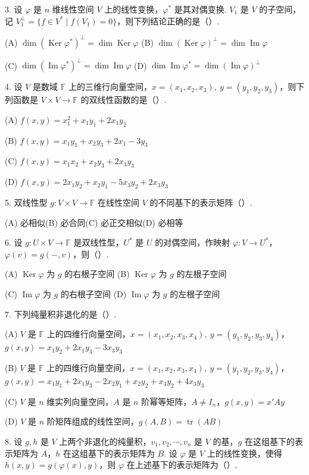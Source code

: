 \documentclass[UTF8,12pt,a4paper,fontset=fandol]{ctexart}
\begin{document}
3. 设 $\varphi$ 是 $n$ 维线性空间 $V$ 上的线性变换，$\varphi^*$ 是其对偶变换. $V_1$ 是 $V$ 的子空间，记 $V_1^\perp=\{f\in V^*\mid f(V_1)=0\}$，则下列结论正确的是（\quad ）.

(A) $\dim(\operatorname{Ker}\varphi^*)^\perp=\dim\operatorname{Ker}\varphi$
\quad
(B) $\dim(\operatorname{Ker}\varphi)^\perp=\dim\operatorname{Im}\varphi$

(C) $\dim(\operatorname{Im}\varphi^*)^\perp=\dim\operatorname{Im}\varphi$
\quad
(D) $\dim\operatorname{Im}\varphi^*=\dim(\operatorname{Im}\varphi)^\perp$

4. 设 $V$ 是数域 $\mathbb{F}$ 上的三维行向量空间，$x=(x_1,x_2,x_3),\ y=(y_1,y_2,y_3)$，则下列函数是 $V\times V\to\mathbb{F}$ 的双线性函数的是（\quad ）.

(A) $f(x,y)=x_1^2+x_1y_1+2x_1y_2$

(B) $f(x,y)=x_1y_1+x_2y_3+2x_1-3y_3$

(C) $f(x,y)=x_1x_2+x_2y_3+2x_3y_3$

(D) $f(x,y)=2x_1y_2+x_2y_1-5x_3y_2+2x_3y_3$

5. 双线性型 $g:V\times V\to\mathbb{F}$ 在线性空间 $V$ 的不同基下的表示矩阵（\quad ）.

(A) 必相似\quad (B) 必合同\quad (C) 必正交相似\quad (D) 必相等

6. 设 $g:U\times V\to\mathbb{F}$ 是双线性型，$U^*$ 是 $U$ 的对偶空间，作映射 $\varphi:V\to U^*$，$\varphi(v)=g(-,v)$，则（\quad ）.

(A) $\operatorname{Ker}\varphi$ 为 $g$ 的右根子空间
\quad
(B) $\operatorname{Ker}\varphi$ 为 $g$ 的左根子空间

(C) $\operatorname{Im}\varphi$ 为 $g$ 的右根子空间
\quad
(D) $\operatorname{Im}\varphi$ 为 $g$ 的左根子空间

7. 下列纯量积非退化的是（\quad ）.

(A) $V$ 是 $\mathbb{F}$ 上的四维行向量空间，$x=(x_1,x_2,x_3,x_4),\ y=(y_1,y_2,y_3,y_4)$，$g(x,y)=x_1y_2+2x_1y_3-3x_3y_3$

(B) $V$ 是 $\mathbb{F}$ 上的四维行向量空间，$x=(x_1,x_2,x_3,x_4),\ y=(y_1,y_2,y_3,y_4)$，$g(x,y)=x_1y_1+2x_1y_3-2x_2y_1+x_2y_2+x_3y_2+4x_3y_3$

(C) $V$ 是 $n$ 维实列向量空间，$A$ 是 $n$ 阶幂等矩阵，$A\ne I_n$，$g(x,y)=x'Ay$

(D) $V$ 是 $n$ 阶矩阵组成的线性空间，$g(A,B)=\operatorname{tr}(AB)$

8. 设 $g,h$ 是 $V$ 上两个非退化的纯量积，$v_1,v_2,\cdots,v_n$ 是 $V$ 的基，$g$ 在这组基下的表示矩阵为 $A$，$h$ 在这组基下的表示矩阵为 $B$. 设 $\varphi$ 是 $V$ 上的线性变换，使得 $h(x,y)=g(\varphi(x),y)$，则 $\varphi$ 在上述基下的表示矩阵为（\quad ）.
\end{document}
